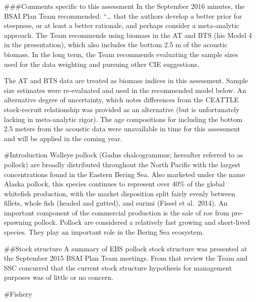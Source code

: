 \#\#\#Comments specific to this assessment In the September 2016
minutes, the BSAI Plan Team recommended: ``\ldots{} that the authors
develop a better prior for steepness, or at least a better rationale,
and perhaps consider a meta-analytic approach. The Team recommends using
biomass in the AT and BTS (his Model 4 in the presentation), which also
includes the bottom 2.5 m of the acoustic biomass. In the long term, the
Team recommends evaluating the sample sizes used for the data weighting
and pursuing other CIE suggestions.

The AT and BTS data are treated as biomass indices in this assessment.
Sample size estimates were re-evaluated and used in the recommended
model below. An alternative degree of uncertainty, which notes
differences from the CEATTLE stock-recruit relationship was provided as
an alternative (but is unfortunately lacking in meta-analytic rigor).
The age compositions for including the bottom 2.5 meters from the
acoustic data were unavailable in time for this assessment and will be
applied in the coming year.

\#Introduction Walleye pollock (Gadus chalcogrammus; hereafter referred
to as pollock) are broadly distributed throughout the North Pacific with
the largest concentrations found in the Eastern Bering Sea. Also
marketed under the name Alaska pollock, this species continues to
represent over 40\% of the global whitefish production, with the market
disposition split fairly evenly between fillets, whole fish (headed and
gutted), and surimi (Fissel et al.~2014). An important component of the
commercial production is the sale of roe from pre-spawning pollock.
Pollock are considered a relatively fast growing and short-lived
species. They play an important role in the Bering Sea ecosystem.

\#\#Stock structure A summary of EBS pollock stock structure was
presented at the September 2015 BSAI Plan Team meetings. From that
review the Team and SSC concurred that the current stock structure
hypothesis for management purposes was of little or no concern.

\#Fishery

